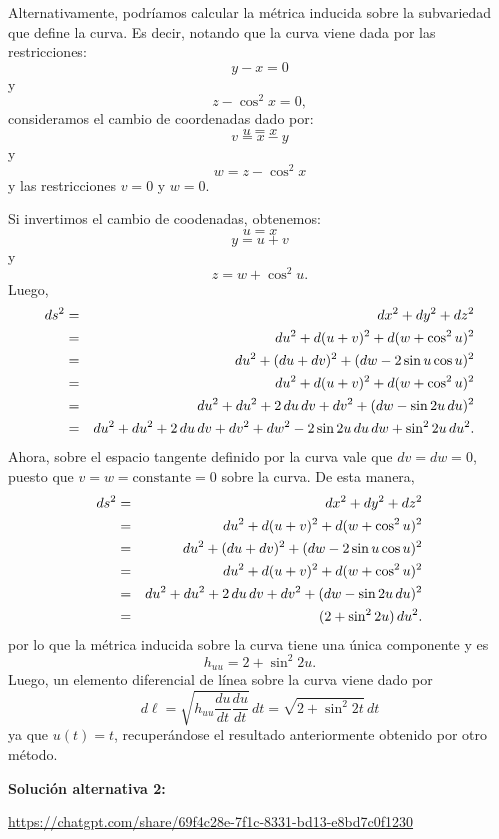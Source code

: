 \documentclass[11pt,spanish]{article}
\begin{document}
Alternativamente, podríamos calcular la m\'etrica inducida sobre la subvariedad que define la curva.
Es decir, notando que la curva viene dada por las restricciones:
$$
y-x=0
$$
y
$$
z-\cos^2 x = 0,
$$
consideramos el cambio de coordenadas dado por:
$$
u=x
$$
$$
v=x-y
$$
y
$$
w = z-\cos^2 x
$$
y las restricciones $v=0$ y $w=0$.

Si invertimos el cambio de coodenadas, obtenemos:
$$
u=x
$$
$$
y = u+v
$$
y
$$
z = w + \cos^2 u
.
$$
Luego,
\begin{eqnarray}
ds^2
&=&
dx^2
+
dy^2
+
dz^2
\notag
\\
&=&
du^2
+
d(u+v)^2
+
d(w+\cos^2 u)^2
\notag
\\
&=&
du^2
+
(du + dv)^2
+
(dw - 2\sin u\cos u)^2
\notag
\\
&=&
du^2
+
d(u+v)^2
+
d(w+\cos^2 u)^2
\notag
\\
&=&
du^2
+
du^2 + 2\,du\,dv + dv^2
+
(dw - \sin 2u\,du)^2
\notag
\\
&=&
du^2
+
du^2 + 2\,du\,dv + dv^2
+
dw^2 - 2\sin 2u\,du\,dw + \sin^2 2u\, du^2
.
\notag
\end{eqnarray}
Ahora, sobre el espacio tangente definido por la curva vale que $dv=dw=0$, puesto que $v=w=\mathrm{constante}=0$ sobre la curva.
De esta manera, 
\begin{eqnarray}
ds^2
&=&
dx^2
+
dy^2
+
dz^2
\notag
\\
&=&
du^2
+
d(u+v)^2
+
d(w+\cos^2 u)^2
\notag
\\
&=&
du^2
+
(du + dv)^2
+
(dw - 2\sin u\cos u)^2
\notag
\\
&=&
du^2
+
d(u+v)^2
+
d(w+\cos^2 u)^2
\notag
\\
&=&
du^2
+
du^2 + 2\,du\,dv + dv^2
+
(dw - \sin 2u\,du)^2
\notag
\\
&=&
(2+\sin^2 2u)\, du^2
.
\notag
\end{eqnarray}
por lo que la m\'etrica inducida sobre la curva tiene una \'unica componente y es
$$
h_{uu}
=
2+\sin^2 2u
.
$$
Luego, un elemento diferencial de l\'inea sobre la curva viene dado por
$$
d\ell
=
\sqrt{h_{uu}\frac{du}{dt}\frac{du}{dt}}\, dt
=
\sqrt{2+\sin^2 2t}\, dt
$$
ya que $u(t)=t$, recuper\'andose el resultado anteriormente obtenido por otro m\'etodo.


{\bf Soluci\'on alternativa 2:}

\url{https://chatgpt.com/share/69f4c28e-7f1c-8331-bd13-e8bd7c0f1230}

%
%
\end{document}
